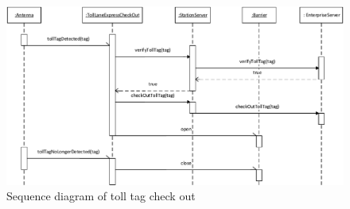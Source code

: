 \begin{figure}[H]
\centerline{\includegraphics[width=1.4\columnwidth]{img/sequence_diagrams/sequence_diagram_toll_tag_check_out}}
\caption{Sequence diagram of toll tag check out}
\label{fig:seq_check_out_toll_tag}
\end{figure}

